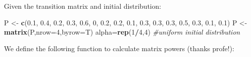 \documentclass[]{article}
\newenvironment{Shaded}{\begin{snugshade}}{\end{snugshade}}
\newcommand{\CommentTok}[1]{\textcolor[rgb]{0.56,0.35,0.01}{\textit{#1}}}
\newcommand{\ControlFlowTok}[1]{\textcolor[rgb]{0.13,0.29,0.53}{\textbf{#1}}}
\newcommand{\DataTypeTok}[1]{\textcolor[rgb]{0.13,0.29,0.53}{#1}}
\newcommand{\DecValTok}[1]{\textcolor[rgb]{0.00,0.00,0.81}{#1}}
\newcommand{\FloatTok}[1]{\textcolor[rgb]{0.00,0.00,0.81}{#1}}
\newcommand{\KeywordTok}[1]{\textcolor[rgb]{0.13,0.29,0.53}{\textbf{#1}}}
\newcommand{\NormalTok}[1]{#1}
\newcommand{\OperatorTok}[1]{\textcolor[rgb]{0.81,0.36,0.00}{\textbf{#1}}}
\newcommand{\StringTok}[1]{\textcolor[rgb]{0.31,0.60,0.02}{#1}}
\begin{document}
Given the transition matrix and initial distribution:

\begin{Shaded}
\begin{Highlighting}[]
\NormalTok{P <-}\StringTok{ }\KeywordTok{c}\NormalTok{(}\FloatTok{0.1}\NormalTok{, }\FloatTok{0.4}\NormalTok{, }\FloatTok{0.2}\NormalTok{, }\FloatTok{0.3}\NormalTok{,}
       \FloatTok{0.6}\NormalTok{,   }\DecValTok{0}\NormalTok{, }\FloatTok{0.2}\NormalTok{, }\FloatTok{0.2}\NormalTok{,}
       \FloatTok{0.1}\NormalTok{, }\FloatTok{0.3}\NormalTok{, }\FloatTok{0.3}\NormalTok{, }\FloatTok{0.3}\NormalTok{,}
       \FloatTok{0.5}\NormalTok{, }\FloatTok{0.3}\NormalTok{, }\FloatTok{0.1}\NormalTok{, }\FloatTok{0.1}\NormalTok{)}
\NormalTok{P <-}\StringTok{ }\KeywordTok{matrix}\NormalTok{(P,}\DataTypeTok{nrow=}\DecValTok{4}\NormalTok{,}\DataTypeTok{byrow=}\NormalTok{T)}
\NormalTok{alpha=}\KeywordTok{rep}\NormalTok{(}\DecValTok{1}\OperatorTok{/}\DecValTok{4}\NormalTok{,}\DecValTok{4}\NormalTok{) }\CommentTok{#uniform initial distribution}
\end{Highlighting}
\end{Shaded}

We define the following function to calculate matrix powers (thanks
profe!):

\begin{Shaded}
\end{Shaded}
\end{document}
